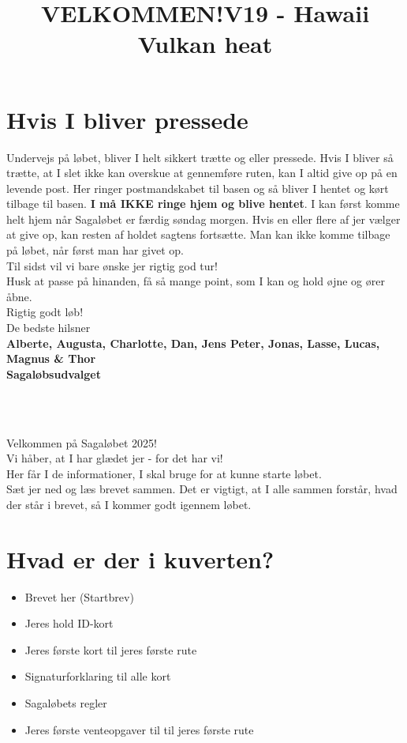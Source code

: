 \section{Hvis I bliver pressede}
Undervejs på løbet, bliver I helt sikkert trætte og eller pressede. Hvis I bliver så trætte, at I slet ikke kan overskue at gennemføre ruten, kan I altid give op på en levende post. Her ringer postmandskabet til basen og så bliver I hentet og kørt tilbage til basen. \textbf{I må IKKE ringe hjem og blive hentet}. I kan først komme helt hjem når Sagaløbet er færdig søndag morgen. Hvis en eller flere af jer vælger at give op, kan resten af holdet sagtens fortsætte. Man kan ikke komme tilbage på løbet, når først man har givet op.\\
\newline
Til sidst vil vi bare ønske jer rigtig god tur!\\
Husk at passe på hinanden, få så mange point, som I kan og hold øjne og ører åbne.\\
\newline
Rigtig godt løb!\\
\newline
\textcolor{søblå}{De bedste hilsner}\\
\textcolor{natblå}{\textbf{Alberte, Augusta, Charlotte, Dan, Jens Peter, Jonas, Lasse, Lucas, Magnus \& Thor}}\\
\textcolor{natblå}{\textbf{Sagaløbsudvalget}}\\
\newpage
\title{VELKOMMEN!}\\
\newline
\title{\textcolor{søblå}{V19 - Hawaii Vulkan heat }}\\
\newline
Velkommen på Sagaløbet 2025!\\
Vi håber, at I har glædet jer - for det har vi!\\
Her får I de informationer, I skal bruge for at kunne starte løbet.\\
Sæt jer ned og læs brevet sammen. Det er vigtigt, at I alle sammen forstår, hvad der står i brevet, så I kommer godt igennem løbet.
\section{Hvad er der i kuverten?}
\begin{itemize}
    \item Brevet her (Startbrev)
    \item Jeres hold ID-kort
    \item Jeres første kort til jeres første rute
    \item Signaturforklaring til alle kort
    \item Sagaløbets regler
    \item Jeres første venteopgaver til til jeres første rute
\end{itemize}
